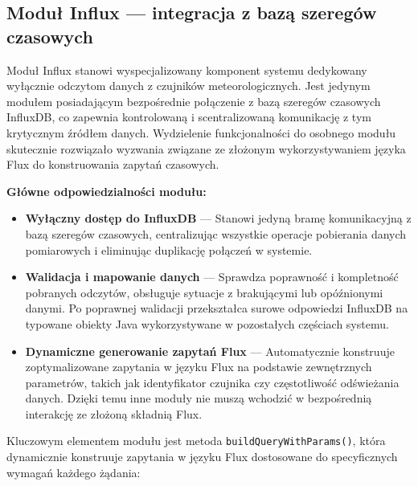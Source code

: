 \documentclass[a4paper,12pt,openany]{book}
\begin{document}
\subsection{Moduł Influx --- integracja z bazą szeregów czasowych}

Moduł Influx stanowi wyspecjalizowany komponent systemu dedykowany wyłącznie odczytom danych z czujników meteorologicznych. Jest jedynym modułem posiadającym bezpośrednie połączenie z bazą szeregów czasowych InfluxDB, co zapewnia kontrolowaną i scentralizowaną komunikację z tym krytycznym źródłem danych. Wydzielenie funkcjonalności do osobnego modułu skutecznie rozwiązało wyzwania związane ze złożonym wykorzystywaniem języka Flux do konstruowania zapytań czasowych.

\vspace{0.5em}
\textbf{Główne odpowiedzialności modułu:}
\begin{itemize}[itemsep=2pt,topsep=4pt,parsep=0pt]
\item \textbf{Wyłączny dostęp do InfluxDB} --- Stanowi jedyną bramę komunikacyjną z bazą szeregów czasowych, centralizując wszystkie operacje pobierania danych pomiarowych i eliminując duplikację połączeń w systemie.

\item \textbf{Walidacja i mapowanie danych} --- Sprawdza poprawność i kompletność pobranych odczytów, obsługuje sytuacje z brakującymi lub opóźnionymi danymi. Po poprawnej walidacji przekształca surowe odpowiedzi InfluxDB na typowane obiekty Java wykorzystywane w pozostałych częściach systemu.

\item \textbf{Dynamiczne generowanie zapytań Flux} --- Automatycznie konstruuje zoptymalizowane zapytania w języku Flux na podstawie zewnętrznych parametrów, takich jak identyfikator czujnika czy częstotliwość odświeżania danych. Dzięki temu inne moduły nie muszą wchodzić w bezpośrednią interakcję ze złożoną składnią Flux.

\end{itemize}

\vspace{-0.4em}

Kluczowym elementem modułu jest metoda \texttt{buildQueryWithParams()}, która dynamicznie konstruuje zapytania w języku Flux dostosowane do specyficznych wymagań każdego żądania:
\end{document}
